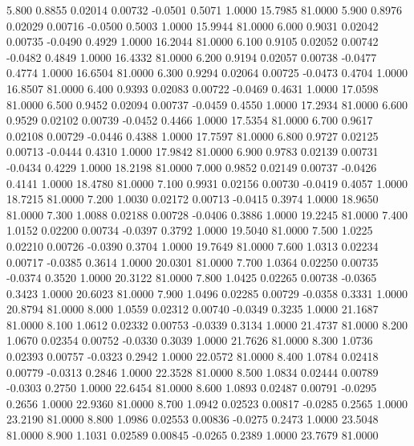    5.800   0.8855   0.02014   0.00732  -0.0501   0.5071   1.0000  15.7985  81.0000
   5.900   0.8976   0.02029   0.00716  -0.0500   0.5003   1.0000  15.9944  81.0000
   6.000   0.9031   0.02042   0.00735  -0.0490   0.4929   1.0000  16.2044  81.0000
   6.100   0.9105   0.02052   0.00742  -0.0482   0.4849   1.0000  16.4332  81.0000
   6.200   0.9194   0.02057   0.00738  -0.0477   0.4774   1.0000  16.6504  81.0000
   6.300   0.9294   0.02064   0.00725  -0.0473   0.4704   1.0000  16.8507  81.0000
   6.400   0.9393   0.02083   0.00722  -0.0469   0.4631   1.0000  17.0598  81.0000
   6.500   0.9452   0.02094   0.00737  -0.0459   0.4550   1.0000  17.2934  81.0000
   6.600   0.9529   0.02102   0.00739  -0.0452   0.4466   1.0000  17.5354  81.0000
   6.700   0.9617   0.02108   0.00729  -0.0446   0.4388   1.0000  17.7597  81.0000
   6.800   0.9727   0.02125   0.00713  -0.0444   0.4310   1.0000  17.9842  81.0000
   6.900   0.9783   0.02139   0.00731  -0.0434   0.4229   1.0000  18.2198  81.0000
   7.000   0.9852   0.02149   0.00737  -0.0426   0.4141   1.0000  18.4780  81.0000
   7.100   0.9931   0.02156   0.00730  -0.0419   0.4057   1.0000  18.7215  81.0000
   7.200   1.0030   0.02172   0.00713  -0.0415   0.3974   1.0000  18.9650  81.0000
   7.300   1.0088   0.02188   0.00728  -0.0406   0.3886   1.0000  19.2245  81.0000
   7.400   1.0152   0.02200   0.00734  -0.0397   0.3792   1.0000  19.5040  81.0000
   7.500   1.0225   0.02210   0.00726  -0.0390   0.3704   1.0000  19.7649  81.0000
   7.600   1.0313   0.02234   0.00717  -0.0385   0.3614   1.0000  20.0301  81.0000
   7.700   1.0364   0.02250   0.00735  -0.0374   0.3520   1.0000  20.3122  81.0000
   7.800   1.0425   0.02265   0.00738  -0.0365   0.3423   1.0000  20.6023  81.0000
   7.900   1.0496   0.02285   0.00729  -0.0358   0.3331   1.0000  20.8794  81.0000
   8.000   1.0559   0.02312   0.00740  -0.0349   0.3235   1.0000  21.1687  81.0000
   8.100   1.0612   0.02332   0.00753  -0.0339   0.3134   1.0000  21.4737  81.0000
   8.200   1.0670   0.02354   0.00752  -0.0330   0.3039   1.0000  21.7626  81.0000
   8.300   1.0736   0.02393   0.00757  -0.0323   0.2942   1.0000  22.0572  81.0000
   8.400   1.0784   0.02418   0.00779  -0.0313   0.2846   1.0000  22.3528  81.0000
   8.500   1.0834   0.02444   0.00789  -0.0303   0.2750   1.0000  22.6454  81.0000
   8.600   1.0893   0.02487   0.00791  -0.0295   0.2656   1.0000  22.9360  81.0000
   8.700   1.0942   0.02523   0.00817  -0.0285   0.2565   1.0000  23.2190  81.0000
   8.800   1.0986   0.02553   0.00836  -0.0275   0.2473   1.0000  23.5048  81.0000
   8.900   1.1031   0.02589   0.00845  -0.0265   0.2389   1.0000  23.7679  81.0000
